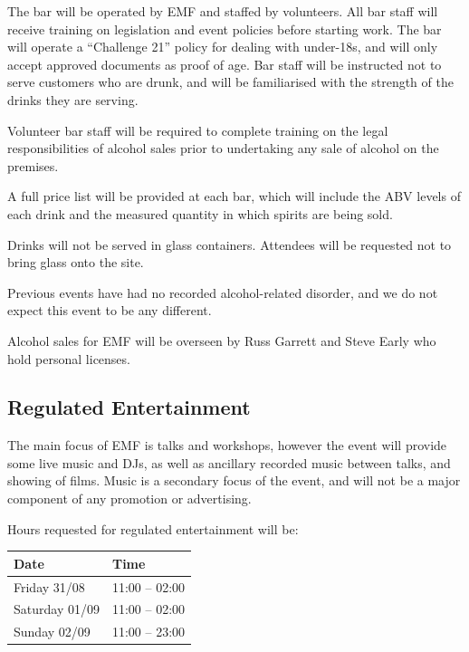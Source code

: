 The bar will be operated by EMF and staffed by volunteers. All bar staff will
receive training on legislation and event policies before starting work. The
bar will operate a ``Challenge 21'' policy for dealing with under-18s, and will
only accept approved documents as proof of age. Bar staff will be instructed
not to serve customers who are drunk, and will be familiarised with the
strength of the drinks they are serving.

Volunteer bar staff will be required to complete training on the legal
responsibilities of alcohol sales prior to undertaking any sale of alcohol
on the premises.

A full price list will be provided at each bar, which will include the ABV
levels of each drink and the measured quantity in which spirits are being sold.

Drinks will not be served in glass containers. Attendees will be requested not to
bring glass onto the site.

Previous events have had no recorded alcohol-related disorder, and we do not
expect this event to be any different.

Alcohol sales for EMF will be overseen by Russ Garrett and Steve Early who
hold personal licenses.

\subsection{Regulated Entertainment}

The main focus of EMF is talks and workshops, however the event will provide
some live music and DJs, as well as ancillary recorded music between talks, and
showing of films. Music is a secondary focus of the event, and will not be a major
component of any promotion or advertising.

Hours requested for regulated entertainment will be:

\begin{table}[h!]
    \centering
    \begin{tabular}{| l l |}
        \hline
        \textbf{Date} & \textbf{Time} \\
        \hline
        Friday 31/08 & 11:00 -- 02:00 \\
        Saturday 01/09 & 11:00 -- 02:00 \\
        Sunday 02/09 & 11:00 -- 23:00 \\
        \hline
    \end{tabular}
\end{table}


